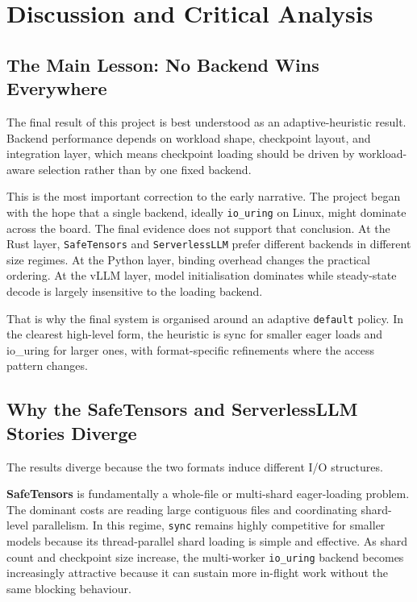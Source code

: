\chapter{Discussion and Critical Analysis}
\label{chap:discussion}

\section{The Main Lesson: No Backend Wins Everywhere}

The final result of this project is best understood as an adaptive-heuristic result. Backend performance depends on workload shape, checkpoint layout, and integration layer, which means checkpoint loading should be driven by workload-aware selection rather than by one fixed backend.

This is the most important correction to the early narrative. The project began with the hope that a single backend, ideally \texttt{io\_uring} on Linux, might dominate across the board. The final evidence does not support that conclusion. At the Rust layer, \texttt{SafeTensors} and \texttt{ServerlessLLM} prefer different backends in different size regimes. At the Python layer, binding overhead changes the practical ordering. At the vLLM layer, model initialisation dominates while steady-state decode is largely insensitive to the loading backend.

That is why the final system is organised around an adaptive \texttt{default} policy. In the clearest high-level form, the heuristic is sync for smaller eager loads and io\_uring for larger ones, with format-specific refinements where the access pattern changes.

\section{Why the SafeTensors and ServerlessLLM Stories Diverge}

The results diverge because the two formats induce different I/O structures.

\textbf{SafeTensors} is fundamentally a whole-file or multi-shard eager-loading problem. The dominant costs are reading large contiguous files and coordinating shard-level parallelism. In this regime, \texttt{sync} remains highly competitive for smaller models because its thread-parallel shard loading is simple and effective. As shard count and checkpoint size increase, the multi-worker \texttt{io\_uring} backend becomes increasingly attractive because it can sustain more in-flight work without the same blocking behaviour.

